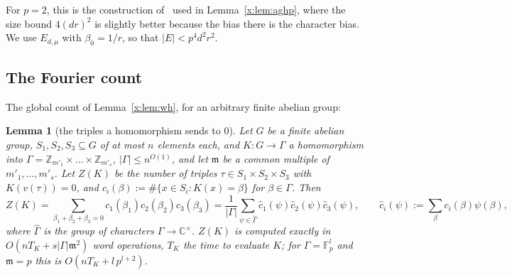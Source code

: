 \documentclass[11pt]{article}
\newtheorem{lemma}[theorem]{Lemma}
\theoremstyle{definition}
\theoremstyle{remark}
\newcommand{\Z}{\mathbb{Z}}
\newcommand{\Fp}{\mathbb{F}_p}
\newcommand{\C}{\mathbb{C}}
\begin{document}
For $p=2$, this is the construction of~\cite[Proposition~3]{AGHP92} used in Lemma~\ref{x:lem:aghp}, where the size bound $4(dr)^2$ is slightly better because the bias there is the character bias. We use $E_{d,\mu}$ with $\beta_0=1/r$, so that $|E|<p^4d^2r^2$.

\subsection{The Fourier count}\label{g:sec:fourier}

The global count of Lemma~\ref{x:lem:wh}, for an arbitrary finite abelian group:

\begin{lemma}[the triples a homomorphism sends to $0$]\label{g:lem:fourier}
Let $G$ be a finite abelian group, $S_1,S_2,S_3\subseteq G$ of at most $n$ elements each, and $K\colon G\to\Gamma$ a homomorphism into $\Gamma=\Z_{m'_1}\times\dots\times\Z_{m'_s}$, $|\Gamma|\le n^{O(1)}$, and let $\mathfrak m$ be a common multiple of $m'_1,\dots,m'_s$. Let $Z(K)$ be the number of triples $\tau\in S_1\times S_2\times S_3$ with $K(v(\tau))=0$, and $c_i(\beta):=\#\{x\in S_i:K(x)=\beta\}$ for $\beta\in\Gamma$. Then
\[
Z(K)=\sum_{\beta_1+\beta_2+\beta_3=0}c_1(\beta_1)c_2(\beta_2)c_3(\beta_3)=\frac1{|\Gamma|}\sum_{\psi\in\hat\Gamma}\hat c_1(\psi)\hat c_2(\psi)\hat c_3(\psi),\qquad \hat c_i(\psi):=\sum_{\beta}c_i(\beta)\psi(\beta),
\]
where $\hat\Gamma$ is the group of characters $\Gamma\to\C^\times$. $Z(K)$ is computed exactly in $O(nT_K+s|\Gamma|\mathfrak m^2)$ word operations, $T_K$ the time to evaluate $K$; for $\Gamma=\Fp^l$ and $\mathfrak m=p$ this is $O(nT_K+l\,p^{l+2})$.
\end{lemma}
\end{document}
